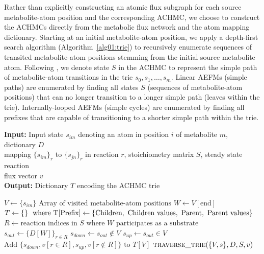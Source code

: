 \documentclass[12pt]{article}
\begin{document}
Rather than explicitly constructing an atomic flux subgraph for each
source metabolite-atom position and the corresponding ACHMC, we choose to
construct the ACHMCs directly from the metabolic flux network and the atom
mapping dictionary. Starting at an initial metabolite-atom position, we
apply a depth-first search algorithm (Algorithm~{\ref{alg01:trie}}) to
recursively enumerate sequences of transited metabolite-atom positions
stemming from the initial source metabolite atom. Following
\citeauthor{ChitpinJustinG2023AMct}, we denote state $S$ in the ACHMC to
represent the simple path of metabolite-atom transitions in the trie $s_0,
s_1, \ldots, s_m$. Linear AEFMs (simple paths) are enumerated by finding
all states $S$ (sequences of metabolite-atom positions) that can no longer
transition to a longer simple path (leaves within the trie).
Internally-looped AEFMs (simple cycles) are enumerated by finding all
prefixes that are capable of transitioning to a shorter simple path within
the trie. 


\begin{algorithm}
\caption{Depth-first construction of the ACHMC trie}\label{alg01:trie}
\hspace*{\algorithmicindent} \textbf{Input:} Input state $s_{im}$
denoting an atom in position $i$ of metabolite $m$, dictionary $D$ \\
\hspace*{\algorithmicindent} mapping $\{s_{im}\}_r$ to $\{s_{jn}\}_r$ in reaction $r$, stoichiometry matrix $S$, steady state reaction\\
\hspace*{\algorithmicindent} flux vector $v$\\
\hspace*{\algorithmicindent} \textbf{Output:} Dictionary $T$ encoding the ACHMC trie
\begin{algorithmic}[1]
    \State $V \gets \{s_{im}\} \text{ Array of visited metabolite-atom positions}$
    \State $W \gets V[\text{end}] \text{}$
    \State $T \gets \{\}\ \text{ where T[\text{Prefix}]} \gets \{\text{Children}, \text{ Children values}, \text{ Parent}, \text{ Parent values}\}$
    \State $R \gets \text{reaction indices in } S \text{ where } W \text{ participates as a substrate}$
    \State $s_{out} \gets \{D[W]\}_{r \in R}$
    \State $s_{down} \gets s_{out} \notin V$ 
    \State $s_{up} \gets s_{out} \in V$
    \State $\text{Add } \{s_{down}, v[r\in R], s_{up}, v[r\notin R]\} \text{ to } T[V]$
        \State $\textsc{traverse\_trie}(\{V, s\}, D, S, v)$
    \EndFor
\EndFunction
\end{algorithmic}
\end{algorithm}
\end{document}

